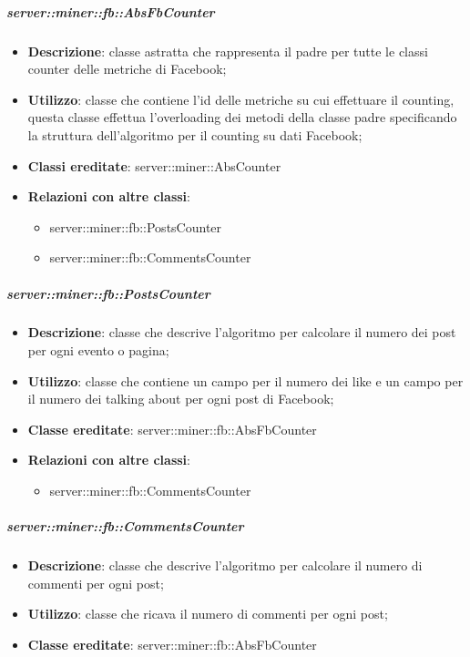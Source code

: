 		\subparagraph{server::miner::fb::AbsFbCounter} %
		\label{subp:server_miner_fb_AbsFbCounter}
			\begin{itemize}
				\item \textbf{Descrizione}: classe astratta che rappresenta il padre per tutte le classi counter delle metriche di Facebook;
				\item \textbf{Utilizzo}: classe che contiene l'id delle metriche su cui effettuare il counting, questa classe effettua l'overloading dei metodi della classe padre specificando la struttura dell'algoritmo per il counting su dati Facebook;
				\item \textbf{Classi ereditate}: server::miner::AbsCounter
				\item \textbf{Relazioni con altre classi}:
					\begin{itemize}
						\item server::miner::fb::PostsCounter
						\item server::miner::fb::CommentsCounter
					\end{itemize}
			\end{itemize}

	\subparagraph{server::miner::fb::PostsCounter} %
		\label{subp:server_miner_fb_PostsCounter}
			\begin{itemize}
				\item \textbf{Descrizione}: classe che descrive l'algoritmo per calcolare il numero dei post per ogni evento o pagina;
				\item \textbf{Utilizzo}: classe che contiene un campo per il numero dei like e un campo per il numero dei talking about per ogni post di Facebook;
				\item \textbf{Classe ereditate}: server::miner::fb::AbsFbCounter
				\item \textbf{Relazioni con altre classi}:
					\begin{itemize}
						\item server::miner::fb::CommentsCounter
					\end{itemize}
			\end{itemize}

	\subparagraph{server::miner::fb::CommentsCounter} %
		\label{subp:server_miner_fb_CommentsCounter}
			\begin{itemize}
				\item \textbf{Descrizione}: classe che descrive l'algoritmo per calcolare il numero di commenti per ogni post;
				\item \textbf{Utilizzo}: classe che ricava il numero di commenti per ogni post;
				\item \textbf{Classe ereditate}: server::miner::fb::AbsFbCounter
			\end{itemize}

